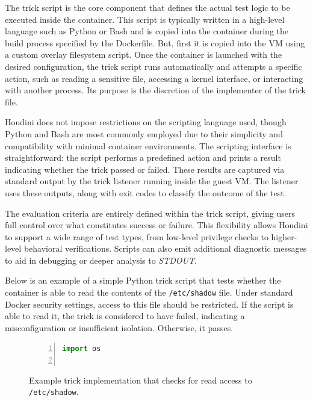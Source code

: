 \documentclass[12pt]{report}
\begin{document}
\begin{doublespace}
The trick script is the core component that defines the actual test logic to be executed inside the container. This script is typically written in a high-level language such as Python or Bash and is copied into the container during the build process specified by the Dockerfile. But, first it is copied into the VM using a custom overlay filesystem script. Once the container is launched with the desired configuration, the trick script runs automatically and attempts a specific action, such as reading a sensitive file, accessing a kernel interface, or interacting with another process. Its purpose is the discretion of the implementer of the trick file.

Houdini does not impose restrictions on the scripting language used, though Python and Bash are most commonly employed due to their simplicity and compatibility with minimal container environments. The scripting interface is straightforward: the script performs a predefined action and prints a result indicating whether the trick passed or failed. These results are captured via standard output by the trick listener running inside the guest VM. The listener uses these outputs, along with exit codes to classify the outcome of the test.

The evaluation criteria are entirely defined within the trick script, giving users full control over what constitutes success or failure. This flexibility allows Houdini to support a wide range of test types, from low-level privilege checks to higher-level behavioral verifications. Scripts can also emit additional diagnostic messages to aid in debugging or deeper analysis to \textit{STDOUT}.

Below is an example of a simple Python trick script that tests whether the container is able to read the contents of the \texttt{/etc/shadow} file. Under standard Docker security settings, access to this file should be restricted. If the script is able to read it, the trick is considered to have failed, indicating a misconfiguration or insufficient isolation. Otherwise, it passes.

\begin{figure}[H]
\caption{Example trick implementation that checks for read access to \texttt{/etc/shadow}.}
\label{fig:trick-script}
\begin{lstlisting}[language=Python, numbers=left, numberstyle=\tiny, stepnumber=1, breaklines=true, frame=single, backgroundcolor=\color{gray!10}, basicstyle=\ttfamily\scriptsize, showspaces=false, showstringspaces=false]
import os


\end{lstlisting}
\end{figure}
\end{doublespace}
\end{document}
